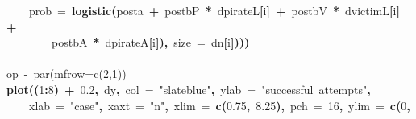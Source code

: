 \documentclass{article}
\makeatletter
\newcommand{\hlnumber}[1]{\textcolor[rgb]{0,0,0}{#1}}%
\newcommand{\hlfunctioncall}[1]{\textcolor[rgb]{.5,0,.33}{\textbf{#1}}}%
\newcommand{\hlstring}[1]{\textcolor[rgb]{.6,.6,1}{#1}}%
\newcommand{\hlkeyword}[1]{\textbf{#1}}%
\newcommand{\hlargument}[1]{\textcolor[rgb]{.69,.25,.02}{#1}}%
\newcommand{\hlcomment}[1]{\textcolor[rgb]{.18,.6,.34}{#1}}%
\newcommand{\hlsymbol}[1]{#1}%
\newcommand{\hlstd}[1]{\textcolor[rgb]{0,0,0}{#1}}%
\newenvironment{kframe}{%
 \def\FrameCommand##1{\hskip\@totalleftmargin \hskip-\fboxsep
 \colorbox{shadecolor}{##1}\hskip-\fboxsep
     \hskip-\linewidth \hskip-\@totalleftmargin \hskip\columnwidth}%
 \MakeFramed {\advance\hsize-\width
   \@totalleftmargin\z@ \linewidth\hsize
   \@setminipage}}%
 {\par\unskip\endMakeFramed}
\newenvironment{knitrout}{}{} %
\makeatother
\begin{document}
\begin{knitrout}
{\begin{kframe}
\begin{flushleft}
\hlstd{}{\ }{\ }{\ }{\ }\hlargument{prob}{\ }\hlargument{=}{\ }\hlfunctioncall{logistic}\hlkeyword{(}\hlsymbol{post}\hlkeyword{\usebox{\hlnormalsizeboxdollar}}\hlsymbol{a}{\ }\hlkeyword{+}{\ }\hlsymbol{post}\hlkeyword{\usebox{\hlnormalsizeboxdollar}}\hlsymbol{bP}{\ }\hlkeyword{*}{\ }\hlsymbol{d}\hlkeyword{\usebox{\hlnormalsizeboxdollar}}\hlsymbol{pirateL}\hlkeyword{[}\hlsymbol{i}\hlkeyword{]}{\ }\hlkeyword{+}{\ }\hlsymbol{post}\hlkeyword{\usebox{\hlnormalsizeboxdollar}}\hlsymbol{bV}{\ }\hlkeyword{*}{\ }\hlsymbol{d}\hlkeyword{\usebox{\hlnormalsizeboxdollar}}\hlsymbol{victimL}\hlkeyword{[}\hlsymbol{i}\hlkeyword{]}{\ }\hlkeyword{+}\hspace*{\fill}\\
\hlstd{}{\ }{\ }{\ }{\ }{\ }{\ }{\ }{\ }\hlsymbol{post}\hlkeyword{\usebox{\hlnormalsizeboxdollar}}\hlsymbol{bA}{\ }\hlkeyword{*}{\ }\hlsymbol{d}\hlkeyword{\usebox{\hlnormalsizeboxdollar}}\hlsymbol{pirateA}\hlkeyword{[}\hlsymbol{i}\hlkeyword{]}\hlkeyword{)}\hlkeyword{,}{\ }\hlargument{size}{\ }\hlargument{=}{\ }\hlsymbol{d}\hlkeyword{\usebox{\hlnormalsizeboxdollar}}\hlsymbol{n}\hlkeyword{[}\hlsymbol{i}\hlkeyword{]}\hlkeyword{)}\hlkeyword{)}\hlkeyword{)}\hspace*{\fill}\\
\hlstd{}\hspace*{\fill}\\
\hlstd{}\hlcomment{\usebox{\hlnormalsizeboxhash}op{\ }\usebox{\hlnormalsizeboxlessthan}-{\ }par(mfrow=c(2,1))}\hspace*{\fill}\\
\hlstd{}\hlfunctioncall{plot}\hlkeyword{(}\hlkeyword{(}\hlnumber{1}\hlkeyword{:}\hlnumber{8}\hlkeyword{)}{\ }\hlkeyword{+}{\ }\hlnumber{0.2}\hlkeyword{,}{\ }\hlsymbol{d}\hlkeyword{\usebox{\hlnormalsizeboxdollar}}\hlsymbol{y}\hlkeyword{,}{\ }\hlargument{col}{\ }\hlargument{=}{\ }\hlstring{"slateblue"}\hlkeyword{,}{\ }\hlargument{ylab}{\ }\hlargument{=}{\ }\hlstring{"successful{\ }attempts"}\hlkeyword{,}\hspace*{\fill}\\
\hlstd{}{\ }{\ }{\ }{\ }\hlargument{xlab}{\ }\hlargument{=}{\ }\hlstring{"case"}\hlkeyword{,}{\ }\hlargument{xaxt}{\ }\hlargument{=}{\ }\hlstring{"n"}\hlkeyword{,}{\ }\hlargument{xlim}{\ }\hlargument{=}{\ }\hlfunctioncall{c}\hlkeyword{(}\hlnumber{0.75}\hlkeyword{,}{\ }\hlnumber{8.25}\hlkeyword{)}\hlkeyword{,}{\ }\hlargument{pch}{\ }\hlargument{=}{\ }\hlnumber{16}\hlkeyword{,}{\ }\hlargument{ylim}{\ }\hlargument{=}{\ }\hlfunctioncall{c}\hlkeyword{(}\hlnumber{0}\hlkeyword{,}\hspace*{\fill}\\

\end{flushleft}
\end{kframe}}
\end{knitrout}
\end{document}
